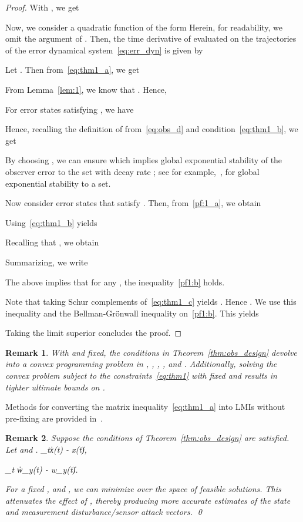 \documentclass[times, doublespace]{rncauth}
\newtheorem{remark}{Remark}
\begin{document}
\begin{proof}
With , we get

Now, we consider a quadratic function of the form  Herein, for readability, we omit the argument of . Then, the time derivative of  evaluated on the trajectories of the error dynamical system~\eqref{eq:err_dyn} is given by
	
	
	Let . Then from~\eqref{eq:thm1_a}, we get
	
	From Lemma~\ref{lem:1}, we know that . Hence,
	
	For error states satisfying , we have
	
	Hence, recalling the definition of  from~\eqref{eq:obs_d} and condition~\eqref{eq:thm1_b}, we get
	
	By choosing , we can ensure 
	 which implies global exponential stability of the observer error  to the set  with decay rate ; see for example,~\cite{Barmish1983, Corless1993}, for global exponential stability to a set.
	
	Now consider error states that satisfy . Then, from~\eqref{pf:1_a}, we obtain
	
Using~\eqref{eq:thm1_b} yields
	 
	Recalling that , we obtain
	
	Summarizing, we write
	
	The above implies that for any , the inequality~\eqref{pf1:b} holds.
	
	Note that taking Schur complements of~\eqref{eq:thm1_c} yields . Hence . We use this inequality and the Bellman-Gr\"onwall inequality on~\eqref{pf1:b}. This yields
	
	Taking the limit superior concludes the proof.
\end{proof}
\begin{remark}
With  and  fixed, the conditions in Theorem~\ref{thm:obs_design} devolve into a convex programming problem in , , , ,  and . Additionally, solving the convex problem  subject to the constraints~\eqref{eq:thm1} with fixed  and  results in tighter ultimate bounds on .
\end{remark}
Methods for converting the matrix inequality~\eqref{eq:thm1_a} into LMIs without pre-fixing  are provided in~\cite{acikmese11obs}.
	
\begin{remark}
Suppose the conditions of Theorem~\ref{thm:obs_design} are satisfied. Let  and . 
\limsup_{t\to\infty}\|x(t) - \hat x(t)\|\le {},

\limsup_{t\to\infty} \|w_y(t) - \hat w_y(t)\| \le {}.

For a fixed ,  and , we can minimize  over the space of feasible solutions. This attenuates the effect of , thereby producing more accurate estimates of the state and measurement disturbance/sensor attack vectors.
\qed\end{remark}
\end{document}
